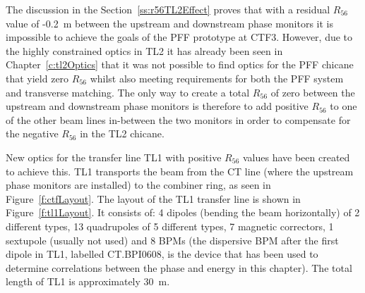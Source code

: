 
The discussion in the Section~\ref{ss:r56TL2Effect} proves that with a residual \(R_{56}\) value of -0.2~m between the upstream and downstream phase monitors it is impossible to achieve the goals of the PFF prototype at CTF3. However, due to the highly constrained optics in TL2 it has already been seen in Chapter~\ref{c:tl2Optics} that it was not possible to find optics for the PFF chicane that yield zero \(R_{56}\) whilst also meeting requirements for both the PFF system and transverse matching. The only way to create a total \(R_{56}\) of zero between the upstream and downstream phase monitors is therefore to add positive \(R_{56}\) to one of the other beam lines in-between the two monitors in order to compensate for the negative \(R_{56}\) in the TL2 chicane. 

New optics for the transfer line TL1 with positive \(R_{56}\) values have been created to achieve this.
TL1 transports the beam from the CT line (where the upstream phase monitors are installed) to the combiner ring, as seen in Figure~\ref{f:ctfLayout}. 
The layout of the TL1 transfer line is shown in Figure~\ref{f:tl1Layout}. It consists of: 4 dipoles (bending the beam horizontally) of 2 different types, 13 quadrupoles of 5 different types, 7 magnetic correctors, 1 sextupole (usually not used) and 8 BPMs \cite{tl1Design} (the dispersive BPM after the first dipole in TL1, labelled CT.BPI0608, is the device that has been used to determine correlations between the phase and energy in this chapter). The total length of TL1 is approximately 30~m.


